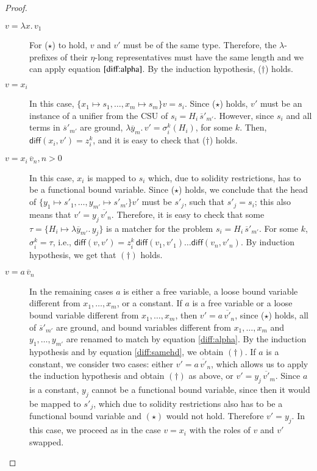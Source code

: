 \begin{proof}
  \begin{description}
    \item[$v = \lambda x. \, v_1$]  For ($\star$) to hold, $v$ and $v'$ must be of the
    same type. Therefore, the $\lambda$-prefixes of their $\eta$-long representatives
    must have the same length and we can apply equation
    $\ref{diff:alpha}$. By the induction hypothesis, ($\dagger$) holds.
    \item[$v = x_i$] In this case, $\{x_1 \mapsto s_1, \ldots, x_m \mapsto
    s_m\} v = s_i$. Since ($\star$) holds, $v'$ must be an instance of a unifier from
    the CSU of $s_i = H_i \, \overline{s}'_{m'}$. However, since $s_i$ and all
    terms in $\overline{s}'_{m'}$ are ground, $\lambda \overline{y}_m. \, v' =
    \sigma_i^k(H_i)$, for some $k$. Then, $\textsf{diff}(x_i, v') = z_i^k$, and
    it is easy to check that ($\dagger$) holds.
    \item[$v = x_i \, \overline{v}_n, n > 0$] In this case, $x_i$ is mapped to $s_i$
    which, due to solidity restrictions, has to be a functional bound variable.
    Since ($\star$) holds, we conclude that the head of $\{y_1 \mapsto s'_1, \ldots,
    y_{m'} \mapsto  s'_{m'}\}v'$ must be $s'_{j}$, such that $s'_{j} = s_i$;
    this also means that $v' = y_j \, \overline{v'}_n$. Therefore, it is easy to
    check that some $\tau = \{ H_i \mapsto \lambda \overline{y}_{m'}. \, y_j\}$ is
    a matcher for the problem $s_i = H_i \, \overline{s}'_{m'}$. For some $k$,
    $\sigma_i^k = \tau$, i.e., $\textsf{diff}(v,v') = z_i^k \, \textsf{diff}(v_1, v'_1)
    \ldots \textsf{diff}(v_n, v'_n) $. By induction hypothesis, we get that $(\dagger)$ holds.
    \item[$v = a \, \overline{v}_n$] In the remaining cases $a$ is either a free variable, a loose bound variable
    different from $x_1, \ldots, x_m$, or a constant. If $a$ is a free variable or a loose bound variable
    different from $x_1, \ldots, x_m$, then $v' = a \, \overline{v'}_n$, since
    ($\star$) holds, all of $\overline{s}'_{m'}$ are ground, and bound variables different from
    $x_1, \ldots, x_m$ and $y_1, \ldots, y_{m'}$ are renamed to match by equation \ref{diff:alpha}. 
    By the induction
    hypothesis and by equation \ref{diff:samehd}, we obtain $(\dagger)$. If $a$ is a constant, we consider two
    cases: either $v' = a \, \overline{v'}_n$, which allows us to apply the induction
    hypothesis and obtain $(\dagger)$ as above, or $v' = y_j \, \overline{v'}_m$.
    Since $a$ is a constant, $y_j$ cannot be a functional bound variable, since
    then it would be mapped to $s'_j$, which due to solidity restrictions 
    also has to be a functional bound
    variable and $(\star)$ would not hold. Therefore $v' = y_j$. In this case, we
    proceed as in the case $v = x_i$ with the roles of $v$ and $v'$ swapped. \qedhere
  \end{description}
  



\end{proof}
